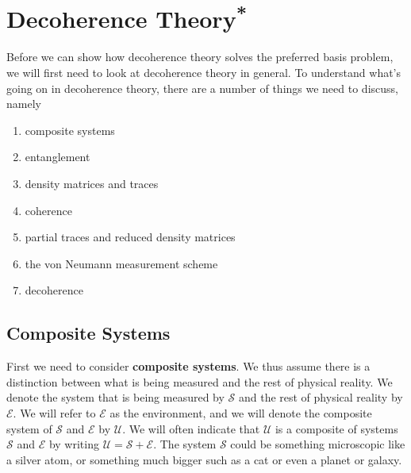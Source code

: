 \documentclass[12pt]{report}
\begin{document}


     

      
    \section{Decoherence Theory\label{decotheory}\textsuperscript{*}\protect\footnotemark}\renewcommand{\thefootnote}{\fnsymbol{footnote}}\renewcommand*{\thefootnote}{\arabic{footnote}}Before we can show how decoherence theory solves the preferred basis problem, we will first need to look at decoherence theory in general. To understand what's going on in decoherence theory, there are a number of things we need to discuss, namely
    \begin{enumerate}[noitemsep, nosep, topsep=0pt]
    \item composite systems
    \item entanglement
    \item density matrices and traces 
    \item coherence
    \item partial traces and reduced density matrices
    \item the von Neumann measurement scheme
    \item decoherence
    \end{enumerate}
    \subsection{Composite Systems} First we need to consider \textbf{composite systems}. We thus assume there is a distinction between what is being measured and the rest of physical reality. We denote the system that is being measured by $\mathcal{S}$ %
%
and the rest of physical reality by $\mathcal{E}$. %
%
We will refer to $\mathcal{E}$ as the environment, and we will denote the composite system of $\mathcal{S}$ and $\mathcal{E}$ by $\mathcal{U}$. We will often indicate that $\mathcal{U}$ %
%
is a composite of systems $\mathcal{S}$ and $\mathcal{E}$ by writing $\mathcal{U}=\mathcal{S}+\mathcal{E}$. The system $\mathcal{S}$ could be something microscopic like a silver atom, or something much bigger such as a cat or even a planet or galaxy.
\end{document}
